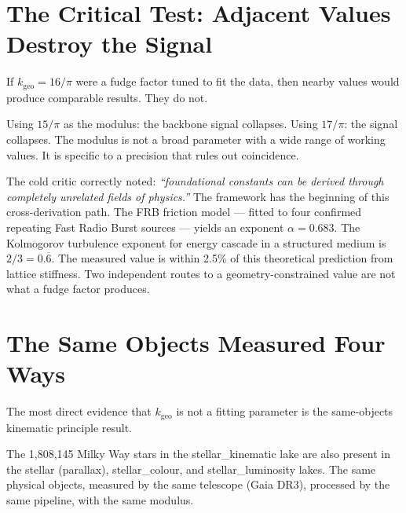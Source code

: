 \documentclass[11pt, letterpaper, openany]{book}
\begin{document}
\section{The Critical Test: Adjacent Values Destroy the Signal}

If $k_\text{geo} = 16/\pi$ were a fudge factor tuned to fit the
data, then nearby values would produce comparable results.
They do not.

Using $15/\pi$ as the modulus: the backbone signal collapses.
Using $17/\pi$: the signal collapses. The modulus is not a
broad parameter with a wide range of working values. It is
specific to a precision that rules out coincidence.

The cold critic correctly noted: \textit{``foundational constants
can be derived through completely unrelated fields of physics.''}
The framework has the beginning of this cross-derivation path.
The FRB friction model --- fitted to four confirmed repeating
Fast Radio Burst sources --- yields an exponent $\alpha = 0.683$.
The Kolmogorov turbulence exponent for energy cascade in a structured
medium is $2/3 = 0.\overline{6}$. The measured value is within
2.5\% of this theoretical prediction from lattice stiffness.
Two independent routes to a geometry-constrained value are not
what a fudge factor produces.

\section{The Same Objects Measured Four Ways}

The most direct evidence that $k_\text{geo}$ is not a fitting
parameter is the same-objects kinematic principle result.

The 1,808,145 Milky Way stars in the stellar\_kinematic lake
are also present in the stellar (parallax), stellar\_colour,
and stellar\_luminosity lakes. The same physical objects,
measured by the same telescope (Gaia DR3), processed by the
same pipeline, with the same modulus.
\end{document}
